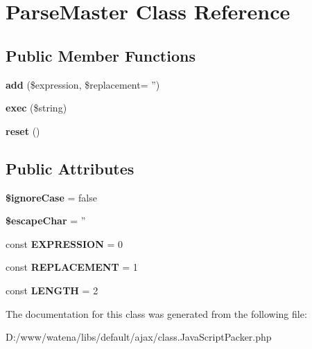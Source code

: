 \hypertarget{class_parse_master}{\section{Parse\-Master Class Reference}
\label{class_parse_master}
}
\subsection*{Public Member Functions}
\begin{DoxyCompactItemize}
\item 
\hypertarget{class_parse_master_a6595c1f73716097d0a5ee65a54c750a8}{{\bfseries add} (\$expression, \$replacement= '')}\label{class_parse_master_a6595c1f73716097d0a5ee65a54c750a8}

\item 
\hypertarget{class_parse_master_a22fe342e77ad0e2e78ed96df33537abf}{{\bfseries exec} (\$string)}\label{class_parse_master_a22fe342e77ad0e2e78ed96df33537abf}

\item 
\hypertarget{class_parse_master_a69afab7366345538571df4328ad001ae}{{\bfseries reset} ()}\label{class_parse_master_a69afab7366345538571df4328ad001ae}

\end{DoxyCompactItemize}
\subsection*{Public Attributes}
\begin{DoxyCompactItemize}
\item 
\hypertarget{class_parse_master_a66a2dbd0fa620f845ee4bf6618bb793e}{{\bfseries \$ignore\-Case} = false}\label{class_parse_master_a66a2dbd0fa620f845ee4bf6618bb793e}

\item 
\hypertarget{class_parse_master_a7c1bb1d66149fdca7f403772f8ed64b1}{{\bfseries \$escape\-Char} = ''}\label{class_parse_master_a7c1bb1d66149fdca7f403772f8ed64b1}

\item 
\hypertarget{class_parse_master_a24dc88efd94df7e70474e99456279a75}{const {\bfseries E\-X\-P\-R\-E\-S\-S\-I\-O\-N} = 0}\label{class_parse_master_a24dc88efd94df7e70474e99456279a75}

\item 
\hypertarget{class_parse_master_a25654580d0e9015e0d5b2263d7e6219c}{const {\bfseries R\-E\-P\-L\-A\-C\-E\-M\-E\-N\-T} = 1}\label{class_parse_master_a25654580d0e9015e0d5b2263d7e6219c}

\item 
\hypertarget{class_parse_master_adda9484bf9da8e5010945bd211f8347b}{const {\bfseries L\-E\-N\-G\-T\-H} = 2}\label{class_parse_master_adda9484bf9da8e5010945bd211f8347b}

\end{DoxyCompactItemize}


The documentation for this class was generated from the following file\-:\begin{DoxyCompactItemize}
\item 
D\-:/www/watena/libs/default/ajax/class.\-Java\-Script\-Packer.\-php\end{DoxyCompactItemize}
